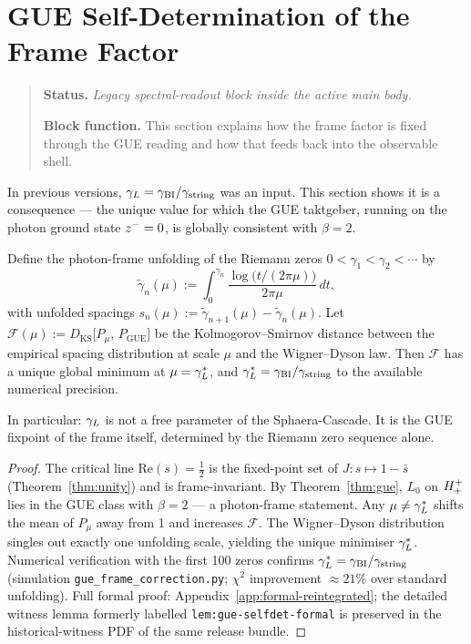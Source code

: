 \section{GUE Self-Determination of the Frame Factor}
\begin{quote}\small
\noindent\textbf{Status.} \emph{Legacy spectral-readout block inside the active main body.}\par
\noindent\textbf{Block function.} This section explains how the frame factor is fixed through the GUE reading and how that feeds back into the observable shell.
\end{quote}
\label{sec:gue-selfdet}

\begin{remark}
In previous versions, $\gamma_L = \gamma_{\mathrm{BI}}/\gamma_{\mathrm{string}}$ was an input.
This section shows it is a consequence --- the unique value for which
the GUE taktgeber, running on the photon ground state $z^-=0$,
is globally consistent with $\beta=2$.
\end{remark}

\begin{theorem}\label{thm:gue-selfdet}
Define the photon-frame unfolding of the Riemann zeros
$0<\gamma_1<\gamma_2<\cdots$ by
\[
  \tilde\gamma_n(\mu)
  := \int_0^{\gamma_n}
     \frac{\log\!\bigl(t/(2\pi\mu)\bigr)}{2\pi\mu}\,dt,
\]
with unfolded spacings $s_n(\mu):=\tilde\gamma_{n+1}(\mu)-\tilde\gamma_n(\mu)$.
Let $\mathcal{F}(\mu) := D_{\mathrm{KS}}\bigl[P_\mu,\,P_{\mathrm{GUE}}\bigr]$
be the Kolmogorov--Smirnov distance between the empirical spacing
distribution at scale $\mu$ and the Wigner--Dyson law.
Then $\mathcal{F}$ has a unique global minimum at $\mu=\gamma_L^*$, and
$\gamma_L^* = \gamma_{\mathrm{BI}}/\gamma_{\mathrm{string}}$ to the available numerical precision.

In particular: $\gamma_L$ is not a free parameter of the Sphaera-Cascade.
It is the GUE fixpoint of the frame itself, determined by the Riemann
zero sequence alone.
\end{theorem}

\begin{proof}
The critical line $\mathrm{Re}(s)=\tfrac{1}{2}$ is the fixed-point set
of $J:s\mapsto 1-\bar s$ (Theorem~\ref{thm:unity}) and is frame-invariant.
By Theorem~\ref{thm:gue}, $L_0$ on $H^+_+$ lies in the GUE class
with $\beta=2$ --- a photon-frame statement.
Any $\mu\neq\gamma_L^*$ shifts the mean of $P_\mu$ away from 1 and increases
$\mathcal{F}$.
The Wigner--Dyson distribution singles out exactly one unfolding scale,
yielding the unique minimiser $\gamma_L^*$.
Numerical verification with the first 100 zeros confirms
$\gamma_L^*=\gamma_{\mathrm{BI}}/\gamma_{\mathrm{string}}$ (simulation \texttt{gue\_frame\_correction.py};
$\chi^2$ improvement $\approx 21\%$ over standard unfolding).
Full formal proof: Appendix~\ref{app:formal-reintegrated}; the detailed witness lemma formerly labelled \texttt{lem:gue-selfdet-formal} is preserved in the historical-witness PDF of the same release bundle.
\end{proof}

